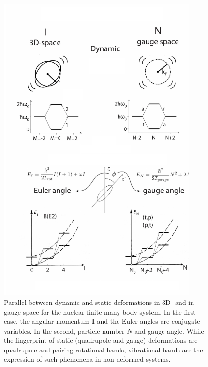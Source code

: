 \begin{figure}
	\centerline{\includegraphics*[width=0.9\textwidth,angle=0]{nutshell/figs/fig1D1_v2.pdf}}
	\caption[Parallel between dynamic and static deformations in 3D- and in gauge-space.]{Parallel between dynamic and static deformations in 3D- and in gauge-space for the nuclear finite many-body system. In the first case, the angular momentum $\mathbf{I}$ and the Euler angles are conjugate variables. In the second, particle number $N$ and gauge angle. While the fingerprint of static (quadrupole and gauge) deformations are quadrupole and pairing rotational bands, vibrational bands are the expression of such phenomena in non deformed systems.}\label{fig1D1}
\end{figure}

